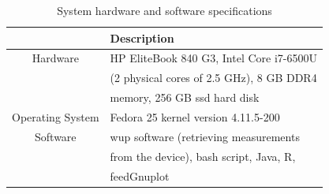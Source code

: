 \begin{table}
		\begin{threeparttable}
	\caption{System hardware and software specifications}
	\label{laptop_specs}
	\begin{tabular}{cl}
		\toprule
		&Description\\
		\midrule
		Hardware	& HP EliteBook 840 G3, Intel Core i7-6500U \\
					& (2 physical cores of 2.5 GHz), 8 GB DDR4  \\
					& memory, 256 GB {\sc ssd}  hard disk \\
		Operating  System & Fedora 25 kernel version 4.11.5-200  \\			
		Software 	& {\sc wup} software (retrieving measurements \\
					& from the device), bash script, Java, R, \\
					& feedGnuplot \\
		\bottomrule
	\end{tabular}
	\end{threeparttable}
\end{table}

